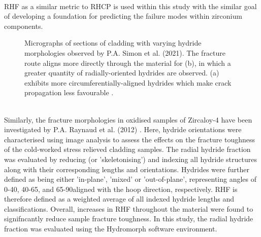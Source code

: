 \documentclass{article}
\begin{document}
	\\
	RHF as a similar metric to RHCP is used within this study with the similar goal of developing a foundation for predicting the failure modes within zirconium components.
	\\
	\begin{figure}[h]
		\centering
		\hfill
		\caption{Micrographs of sections of cladding with varying hydride morphologies observed by P.A. Simon et al. (2021). The fracture route aligns more directly through the material for (b), in which a greater quantity of radially-oriented hydrides are observed. (a) exhibits more circumferentially-aligned hydrides which make crack propagation less favourable \cite{Simon2021}.}
		\label{fig:rad_circ_frac}
	\end{figure}
	\\
    Similarly, the fracture morphologies in oxidised samples of Zircaloy-4 have been investigated by P.A. Raynaud et al. (2012) \cite{RAYNAUD201269}. Here, hydride orientations were characterised using image analysis to assess the effects on the fracture toughness of the cold-worked stress relieved cladding samples. The radial hydride fraction was evaluated by reducing (or 'skeletonising') and indexing all hydride structures along with their corresponding lengths and orientations. Hydrides were further defined as being either 'in-plane', 'mixed' or 'out-of-plane', representing angles of 0-40\textdegree, 40-65\textdegree, and 65-90\textdegree aligned with the hoop direction, respectively. RHF is therefore defined as a weighted average of all indexed hydride lengths and classifications. Overall, increases in RHF throughout the material were found to signifncantly reduce sample fracture toughness. In this study, the radial hydride fraction was evaluated using the Hydromorph software environment.
\end{document}
